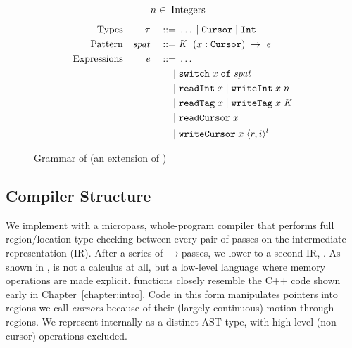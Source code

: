 \begin{figure}
  \begin{displaymath}
    \begin{aligned}
      &n \in \; \textup{Integers}
    \end{aligned}
  \end{displaymath}
  \begin{displaymath}
    \begin{aligned}
      \textup{Types} && \mathit{\tau} && \; ::= \; & \ldots \; | \; \texttt{Cursor} \; | \; \texttt{Int} \\
      \textup{Pattern} && \mathit{spat} && \; ::= \; & \mathit{K} \; \;(x : \texttt{Cursor}) \;\rightarrow \;\mathit{e} \\
      \textup{Expressions} && \mathit{e} && \; ::= \; & \dots \\
      && && \; | \; & \texttt{switch}\; x \;\texttt{of}\;\mathit{spat}\\
      && && \; | \; & \texttt{\text{readInt}} \; x \; | \; \texttt{\text{writeInt}} \; x \; n \\
      && && \; | \; & \texttt{\text{readTag}} \; x \; | \; \texttt{\text{writeTag}} \; x \; \mathit{K} \\
      && && \; | \; & \texttt{\text{readCursor}} \; x \\
      && && \; | \; & \texttt{\text{writeCursor}} \; x \; \langle r, i \rangle ^{l} \\
    \end{aligned}
  \end{displaymath}
  \normalsize
  \caption{{Grammar of \lamcur{} (an extension of \ourcalc{}) \captionscrunch}}
  \label{fig:nocal-grammar}
\end{figure}

\subsection{Compiler Structure}\label{subsec:compiler_structure}
We implement \ourcalc with a micropass, whole-program compiler that performs
full region/location type checking
between every pair of passes on the \ourcalc intermediate representation (IR).
%
%
After a series of \ourcalc$\rightarrow$\ourcalc passes, we lower to a second IR,
\emph{\lamcur}.
As shown in ,
\lamcur is not a calculus at all, but a low-level language where
memory operations are made explicit.  \lamcur{} functions closely resemble the C++
code shown early in Chapter~\ref{chapter:intro}.
%
Code in this form manipulates pointers into regions we call {\em cursors} because of
their (largely continuous) motion through regions.
%
{We represent \lamcur internally as a
  distinct AST type, with high level (non-cursor) operations excluded.}

